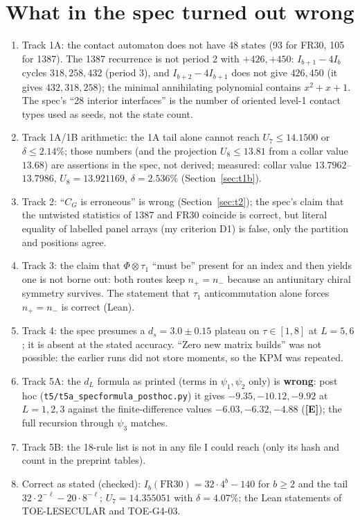 \documentclass[10pt]{article}
\newcommand{\lab}[1]{\textbf{[#1]}}
\begin{document}
\section{What in the spec turned out wrong}\label{sec:wrong}
\begin{enumerate}
\item Track 1A: the contact automaton does not have 48 states (93 for FR30, 105 for 1387). The 1387 recurrence is not period 2 with $+426,+450$: $I_{b+1}-4I_b$ cycles $318,258,432$ (period 3), and $I_{b+2}-4I_{b+1}$ does not give $426,450$ (it gives $432,318,258$); the minimal annihilating polynomial contains $x^2+x+1$. The spec's ``28 interior interfaces'' is the number of oriented level-1 contact types used as seeds, not the state count.
\item Track 1A/1B arithmetic: the 1A tail alone cannot reach $U_7\le14.1500$ or $\delta\le2.14\%$; those numbers (and the projection $U_8\le13.81$ from a collar value $13.68$) are assertions in the spec, not derived; measured: collar value $13.7962$--$13.7986$, $U_8=13.921169$, $\delta=2.536\%$ (Section~\ref{sec:t1b}).
\item Track 2: ``$C_G$ is erroneous'' is wrong (Section~\ref{sec:t2}); the spec's claim that the untwisted statistics of 1387 and FR30 coincide is correct, but literal equality of labelled panel arrays (my criterion D1) is false, only the partition and positions agree.
\item Track 3: the claim that $\Phi\otimes\tau_1$ ``must be'' present for an index and then yields one is not borne out: both routes keep $n_+=n_-$ because an antiunitary chiral symmetry survives. The statement that $\tau_1$ anticommutation alone forces $n_+=n_-$ is correct (Lean).
\item Track 4: the spec presumes a $d_s=3.0\pm0.15$ plateau on $\tau\in[1,8]$ at $L=5,6$; it is absent at the stated accuracy. ``Zero new matrix builds'' was not possible: the earlier runs did not store moments, so the KPM was repeated.
\item Track 5A: the $d_L$ formula as printed (terms in $\psi_1,\psi_2$ only) is \textbf{wrong}: post hoc (\texttt{t5/t5a\_specformula\_posthoc.py}) it gives $-9.35,-10.12,-9.92$ at $L=1,2,3$ against the finite-difference values $-6.03,-6.32,-4.88$ (\lab{E}); the full recursion through $\psi_3$ matches.
\item Track 5B: the 18-rule list is not in any file I could reach (only its hash and count in the preprint tables).
\item Correct as stated (checked): $I_b(\mathrm{FR30})=32\cdot4^b-140$ for $b\ge2$ and the tail $32\cdot2^{-\ell}-20\cdot8^{-\ell}$; $U_7=14.355051$ with $\delta=4.07\%$; the Lean statements of TOE-LESECULAR and TOE-G4-03.
\end{enumerate}
\end{document}
